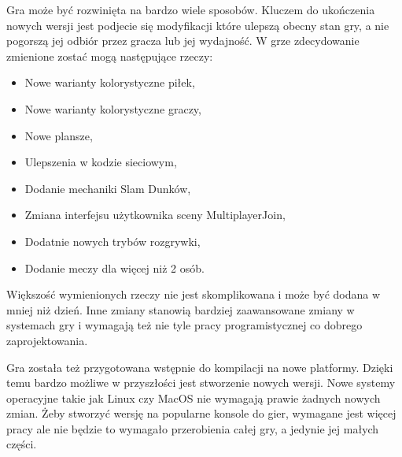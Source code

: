 \documentclass[a4paper,12pt,twoside,openany]{report}
\begin{document}
Gra może być rozwinięta na bardzo wiele sposobów. Kluczem do ukończenia nowych wersji jest podjecie się modyfikacji które ulepszą obecny stan gry, a nie pogorszą jej odbiór przez gracza lub jej wydajność. W grze zdecydowanie zmienione zostać mogą następujące rzeczy:
\begin{itemize}
    \item Nowe warianty kolorystyczne piłek,
    \item Nowe warianty kolorystyczne graczy,
    \item Nowe plansze,
    \item Ulepszenia w kodzie sieciowym,
    \item Dodanie mechaniki Slam Dunków,
    \item Zmiana interfejsu użytkownika sceny MultiplayerJoin,
    \item Dodatnie nowych trybów rozgrywki,
    \item Dodanie meczy dla więcej niż 2 osób.
\end{itemize}
Większość wymienionych rzeczy nie jest skomplikowana i może być dodana w mniej niż dzień. Inne zmiany stanowią bardziej zaawansowane zmiany w systemach gry i wymagają też nie tyle pracy programistycznej co dobrego zaprojektowania.

Gra została też przygotowana wstępnie do kompilacji na nowe platformy. Dzięki temu bardzo możliwe w przyszłości jest stworzenie nowych wersji. Nowe systemy operacyjne takie jak Linux czy MacOS nie wymagają prawie żadnych nowych zmian. Żeby stworzyć wersję na popularne konsole do gier, wymagane jest więcej pracy ale nie będzie to wymagało przerobienia całej gry, a jedynie jej małych części.

\end{document}
